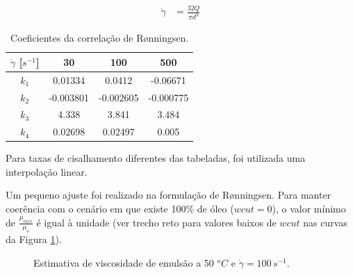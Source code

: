 \documentclass[final,5p]{elsarticle}
\numberwithin{equation}{section}
\begin{document}
        \begin{align}
            \dot{\gamma} &= \frac{32 Q}{\pi d^3}
        \end{align}

        \begin{table}[ht]
            \centering
            \begin{tabular}{c|ccc}
                $\dot{\gamma}$ [$s^{-1}$] & 30 & 100 & 500 \\
                 \hline
                 $k_1$ & 0.01334 & 0.0412 & -0.06671 \\
                 $k_2$ & -0.003801 & -0.002605 & -0.000775 \\
                 $k_3$ & 4.338 & 3.841 & 3.484 \\
                 $k_4$ & 0.02698 & 0.02497 & 0.005 \\
            \end{tabular}
            \caption{Coeficientes da correlação de Rønningsen.}
            \label{tab:ronningsen}
        \end{table}

        Para taxas de cisalhamento diferentes das tabeladas, foi utilizada uma interpolação linear.

        Um pequeno ajuste foi realizado na formulação de Rønningsen. Para manter coerência com o cenário em que existe 100\% de óleo ($wcut=0$), o valor mínimo de $\frac{\mu_{mix}}{\mu_o}$ é igual à unidade (ver trecho reto para valores baixos de $wcut$ nas curvas da Figura \ref{fig:emulsao}).

        \begin{figure}[hbt!]
            \caption{Estimativa de viscosidade de emulsão a 50 $^oC$ e $\dot{\gamma} = 100\,s^{-1}$.}
            \label{fig:emulsao}
        \end{figure}
\end{document}
